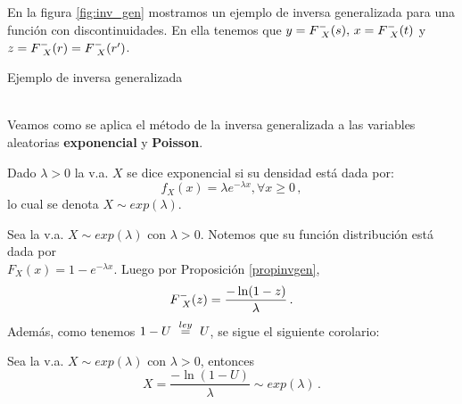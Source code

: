 En la figura \ref{fig:inv_gen} mostramos un ejemplo de inversa generalizada para una función con discontinuidades. En ella tenemos que $y=F^-_{\mbox{ }X}(s), \, x = F^-_{\mbox{ }X}(t)$ y $z=F^-_{\mbox{ }X}(r)=F^-_{\mbox{ }X}(r')$.
\begin{images}[\label{fig:inv_gen}]{Ejemplo de inversa generalizada}
	\imagesnewline
\end{images}

\vspace{1.5cm}\\
Veamos como se aplica el método de la inversa generalizada a las variables aleatorias \textbf{exponencial} y \textbf{Poisson}.

\begin{definition}
Dado $\lambda>0$ la v.a. $X$ se dice exponencial si su densidad está dada por:
$$ f_X(x) = \lambda e^{-\lambda x}, \forall x\geq 0 \, ,$$
lo cual se denota $X\sim exp(\lambda)$.
\end{definition}

Sea la v.a. $X\sim exp(\lambda)$ con $\lambda>0$. Notemos que su función distribución está dada por \\ $F_X(x)=1-e^{-\lambda x}$. Luego por Proposición \ref{propinvgen},
$$F^-_{\mbox{ }X}(z)=\displaystyle\frac{-\ln(1-z)}{\lambda} \, .$$
Además, como tenemos $1-U\mbox{ }\overset{ley}{=}\mbox{ } U$, se sigue el siguiente corolario:
\begin{corolary}
\label{simexp}  %
Sea la v.a. $X\sim exp(\lambda)$ con $\lambda>0$, entonces
$$X=\displaystyle\frac{-\ln(1-U)}{\lambda}\sim exp(\lambda) \, .$$
\end{corolary}

